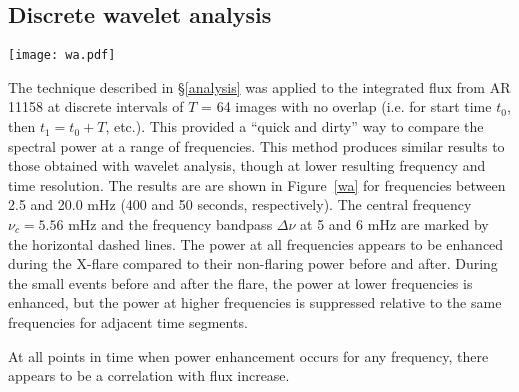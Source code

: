 \subsection{Discrete wavelet analysis}

\begin{figure*}[htb!]\centering
    \texttt{[image: wa.pdf]}
    \caption{
        Time-frequency power plots from AIA 1600\AA{} (top panel) and AIA
        1700\AA{} (bottom panel), obtained by applying a Fourier transform to
        integrated emission from NOAA AR 11158 in discrete time increments of
        64 frames ($\sim$25.6 minutes) each. The dashed horizontal line marks the
        central frequency $\nu_{c}$ at $\sim$5.6 mHz, corresponding to a period
        of 3 minutes. The dotted horizontal lines on either side of $\nu_{c}$
        mark the edges of the frequency bandpass $\Delta\nu$ = 1 mHz. The
        vertical lines mark the flare, start, peak, and end times as determined
        by \textit{GOES}. The power is scaled logarithmically and over the same
        range in both channels.
        \label{wa}}
\end{figure*}


The technique described in \S\ref{analysis} was applied
to the integrated flux from AR 11158 at
discrete intervals of $T$ = 64 images with no overlap
(i.e. for start time $t_{0}$, then $t_{1} = t_{0}+T$, etc.).
This provided a ``quick and dirty'' way
to compare the spectral power at a range of frequencies.
This method produces similar results to those
obtained with wavelet analysis, though
at lower resulting frequency and time resolution.
The results are are shown in
Figure~\ref{wa}
for frequencies between 2.5 and 20.0 mHz (400 and 50 seconds, respectively).
The central frequency $\nu_{c} = 5.56$ mHz
and the frequency bandpass $\Delta\nu$ at 5 and 6 mHz
are marked by the horizontal dashed lines.
The power at all frequencies
appears to be enhanced during the X-flare compared to their
non-flaring power before and after.
During the small events before and after the flare,
the power at lower frequencies is enhanced,
but the power at higher frequencies is suppressed relative to
the same frequencies for adjacent time segments.

At all points in time when power enhancement occurs for any frequency,
there appears to be a correlation with flux increase.
